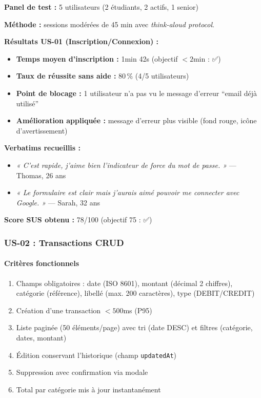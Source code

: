 \begin{tcolorbox}[colback=green!5!white,colframe=green!60!black,title=\textbf{Tests utilisateurs effectués — Novembre 2024}]
\textbf{Panel de test :} 5 utilisateurs (2 étudiants, 2 actifs, 1 senior)

\textbf{Méthode :} sessions modérées de 45 min avec \textit{think-aloud protocol}.

\textbf{Résultats US-01 (Inscription/Connexion) :}
\begin{itemize}
    \item \textbf{Temps moyen d'inscription :} 1min 42s (objectif $< 2$min : ✅)
    \item \textbf{Taux de réussite sans aide :} 80\,\% (4/5 utilisateurs)
    \item \textbf{Point de blocage :} 1 utilisateur n'a pas vu le message d'erreur ``email déjà utilisé''
    \item \textbf{Amélioration appliquée :} message d'erreur plus visible (fond rouge, icône d'avertissement)
\end{itemize}

\textbf{Verbatims recueillis :}
\begin{itemize}
    \item[\textbullet] \textit{« C'est rapide, j'aime bien l'indicateur de force du mot de passe. »} — Thomas, 26 ans
    \item[\textbullet] \textit{« Le formulaire est clair mais j'aurais aimé pouvoir me connecter avec Google. »} — Sarah, 32 ans
\end{itemize}

\textbf{Score SUS obtenu :} 78/100 (objectif 75 : ✅)
\end{tcolorbox}

\subsubsection{US-02 : Transactions CRUD}

\paragraph{Critères fonctionnels}
\begin{enumerate}
  \item Champs obligatoires : date (ISO 8601), montant (décimal 2 chiffres), catégorie (référence), libellé (max. 200 caractères), type (DEBIT/CREDIT)
  \item Création d'une transaction $< 500$ms (P95)
  \item Liste paginée (50 éléments/page) avec tri (date DESC) et filtres (catégorie, dates, montant)
  \item Édition conservant l'historique (champ \texttt{updatedAt})
  \item Suppression avec confirmation via modale
  \item Total par catégorie mis à jour instantanément
\end{enumerate}

